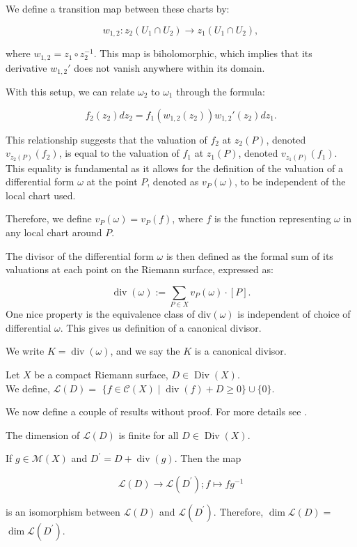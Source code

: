 We define a transition map between these charts by:

\[
w_{1,2}: z_2(U_1 \cap U_2) \to z_1(U_1 \cap U_2),
\]

where \( w_{1,2} = z_1 \circ z_2^{-1} \). This map is biholomorphic, which implies that its derivative \( w_{1,2}' \) does not vanish anywhere within its domain.

With this setup, we can relate \( \omega_2 \) to \( \omega_1 \) through the formula:

\[
f_2(z_2)dz_2 = f_1(w_{1,2}(z_2))w_{1,2}'(z_2)dz_1.
\]

This relationship suggests that the valuation of \( f_2 \) at \( z_2(P) \), denoted \( v_{z_2(P)}(f_2) \), is equal to the valuation of \( f_1 \) at \( z_1(P) \), denoted \( v_{z_1(P)}(f_1) \). This equality is fundamental as it allows for the definition of the valuation of a differential form \( \omega \) at the point \( P \), denoted as \( v_P(\omega) \), to be independent of the local chart used.

Therefore, we define \( v_P(\omega) = v_P(f) \), where \( f \) is the function representing \( \omega \) in any local chart around \( P \).

The divisor of the differential form \( \omega \) is then defined as the formal sum of its valuations at each point on the Riemann surface, expressed as:

\[
\operatorname{div}(\omega) := \sum_{P \in X} v_P(\omega) \cdot [P].
\]
One nice property is the equivalence class of div$(\omega)$ is independent of choice of differential $\omega$. This gives us definition of a canonical divisor. 

\begin{definition}
   We write $K=\operatorname{div}(\omega)$, and we say the $K$ is a canonical divisor.  
\end{definition}

Let $X$ be a compact Riemann surface, $D \in \operatorname{Div}(X)$.\\
We define,
$\mathscr{L}(D)=$ $\{f \in \mathcal{C}(X) \mid \operatorname{div}(f)+D \geq 0\} \cup\{0\}$. 

We now define a couple of results without proof. For more details see \cite{diamond2005first}. 

\begin{theorem}
    The dimension of $\mathscr{L}(D)$ is finite for all $D \in \operatorname{Div}(X)$.

If $g \in \mathcal{M}(X)$ and $D^{\prime}=D+\operatorname{div}(g)$. Then the map

$$
\mathscr{L}(D) \longrightarrow \mathscr{L}\left(D^{\prime}\right) ; f \mapsto f g^{-1}
$$

is an isomorphism between $\mathscr{L}(D)$ and $\mathscr{L}\left(D^{\prime}\right)$. Therefore, $\operatorname{dim} \mathscr{L}(D)=$ $\operatorname{dim} \mathscr{L}\left(D^{\prime}\right)$. 
\end{theorem}

